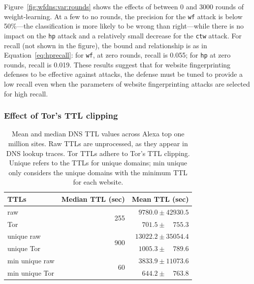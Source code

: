 Figure~\ref{fig:wfdns:var:rounds} shows the effects of between 0 and 3000
rounds of weight-learning. At a few to no rounds, the precision for the \texttt{wf}
attack is below 50\%---the classification is more likely to be wrong than
right---while there is no impact on the \texttt{hp} attack and a relatively
small decrease for the \texttt{ctw} attack.
For recall (not shown in the figure), the bound and relationship is
as in Equation~\ref{eq:hprecall}: for \texttt{wf}, at zero rounds, recall is 0.055; for
\texttt{hp} at zero rounds, recall is 0.019. These results suggest that for
website fingerprinting defenses to be effective against \name attacks, the
defense must be tuned to provide a low recall even when the parameters of
website fingerprinting attacks are selected for high recall.

\subsubsection{Effect of Tor's TTL clipping}

\begin{table}[t]
\centering
\begin{tabular}{l r r}
\toprule
\textbf{TTLs} & \textbf{Median TTL (sec)} & \textbf{Mean TTL (sec)} \\
\midrule
raw & \multirow{ 2}{*}{255} & $9780.0\pm42930.5$ \\ %
Tor &  & $701.5\pm\phantom{00}755.3$ \\ %
unique raw & \multirow{ 2}{*}{900} & $13022.2\pm35054.4$ \\ %
unique Tor &  & $1005.3\pm\phantom{00}789.6$ \\ %
min unique raw & \multirow{ 2}{*}{60} & $3833.9\pm11073.6$ \\ %
min unique Tor & & $644.2\pm\phantom{00}763.8$ \\ %
\bottomrule
\end{tabular}
\caption{Mean and median DNS TTL values across Alexa top one million
  sites. Raw TTLs are unprocessed, as they appear in DNS lookup
  traces. Tor TTLs adhere to Tor's TTL clipping.
Unique refers to the TTLs for unique domains; min unique only
considers the unique domains with the minimum TTL for each website.}
\label{tab:ttls}
\end{table}

